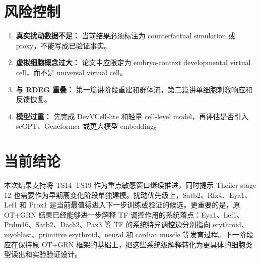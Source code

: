 \documentclass[UTF8,12pt]{ctexart}
\newcommand{\OT}{\textsc{OT}}
\newcommand{\GRN}{\textsc{GRN}}
\begin{document}
\section{风险控制}

\begin{enumerate}[label=\arabic*.]
    \item \textbf{真实扰动数据不足：} 当前结果必须标注为 counterfactual simulation 或 proxy，不能写成已验证事实。
    \item \textbf{虚拟细胞概念过大：} 论文中应限定为 embryo-context developmental virtual cell，而不是 universal virtual cell。
    \item \textbf{与 RDEG 重叠：} 第一篇讲阶段重建和群体流，第二篇讲单细胞刺激响应和反馈恢复。
    \item \textbf{模型过重：} 先完成 DevVCell-lite 和轻量 cell-level model，再评估是否引入 scGPT、Geneformer 或更大模型 embedding。
\end{enumerate}

\section{当前结论}

本次结果支持将 TS14--TS19 作为重点敏感窗口继续推进，同时提示 Theiler stage 12 也需要作为早期高变化阶段单独建模。扰动优先级上，Satb2、Rfx4、Eya1、Lef1 和 Prox1 是当前最值得进入下一步训练或验证的候选。更重要的是，原 \OT{}+\GRN{} 结果已经能够进一步解释 TF 调控作用的系统落点：Eya1、Lef1、Prdm16、Satb2、Dach2、Pax3 等 TF 的系统特异调控边分别指向 erythroid、myoblast、primitive erythroid、neural 和 cardiac muscle 等发育过程。下一阶段应在保持原 \OT{}+\GRN{} 框架的基础上，把这些系统级解释转化为更具体的细胞类型读出和实验验证设计。
\end{document}
